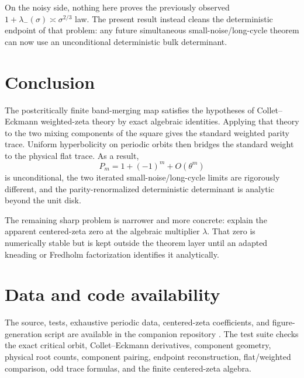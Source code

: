 \documentclass[11pt]{article}
\theoremstyle{definition}
\theoremstyle{remark}
\begin{document}
On the noisy side, nothing here proves the previously observed
$1+\lambda_-(\sigma)\asymp\sigma^{2/3}$ law.  The present result instead
cleans the deterministic endpoint of that problem: any future simultaneous
small-noise/long-cycle theorem can now use an unconditional deterministic
bulk determinant.

\section{Conclusion}

The postcritically finite band-merging map satisfies the hypotheses of
Collet--Eckmann weighted-zeta theory by exact algebraic identities.  Applying
that theory to the two mixing components of the square gives the standard
weighted parity trace.  Uniform hyperbolicity on periodic orbits then bridges
the standard weight to the physical flat trace.  As a result,
\[
 P_m=1+(-1)^m+O(\theta^m)
\]
is unconditional, the two iterated small-noise/long-cycle limits are
rigorously different, and the parity-renormalized deterministic determinant
is analytic beyond the unit disk.

The remaining sharp problem is narrower and more concrete: explain the
apparent centered-zeta zero at the algebraic multiplier $\lambda$.  That zero
is numerically stable but is kept outside the theorem layer until an adapted
kneading or Fredholm factorization identifies it analytically.

\section*{Data and code availability}

The source, tests, exhaustive periodic data, centered-zeta coefficients, and
figure-generation script are available in the companion repository
\citep{WangFlatTraceCode2026}.  The test suite checks the exact critical orbit,
Collet--Eckmann derivatives, component geometry, physical root counts,
component pairing, endpoint reconstruction, flat/weighted comparison, odd
trace formulas, and the finite centered-zeta algebra.



\end{document}

